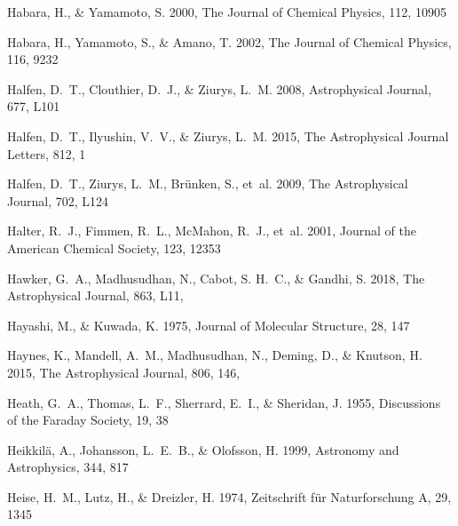\documentclass[twocolumn]{aastex631}
\begin{document}
\begin{thebibliography}{}
Habara, H., \& Yamamoto, S. 2000, The Journal of Chemical Physics, 112, 10905

Habara, H., Yamamoto, S., \& Amano, T. 2002, The Journal of Chemical Physics,
  116, 9232

Halfen, D.~T., Clouthier, D.~J., \& Ziurys, L.~M. 2008, Astrophysical Journal,
  677, L101

Halfen, D.~T., Ilyushin, V.~V., \& Ziurys, L.~M. 2015, The Astrophysical
  Journal Letters, 812, 1

Halfen, D.~T., Ziurys, L.~M., Br{\"u}nken, S., {et~al.} 2009, The Astrophysical
  Journal, 702, L124

Halter, R.~J., Fimmen, R.~L., McMahon, R.~J., {et~al.} 2001, Journal of the
  American Chemical Society, 123, 12353

{Hawker}, G.~A., {Madhusudhan}, N., {Cabot}, S. H.~C., \& {Gandhi}, S. 2018,
  The Astrophysical Journal, 863, L11, 

Hayashi, M., \& Kuwada, K. 1975, Journal of Molecular Structure, 28, 147

{Haynes}, K., {Mandell}, A.~M., {Madhusudhan}, N., {Deming}, D., \& {Knutson},
  H. 2015, The Astrophysical Journal, 806, 146,

Heath, G.~A., Thomas, L.~F., Sherrard, E.~I., \& Sheridan, J. 1955, Discussions
  of the Faraday Society, 19, 38

{Heikkil{\"a}}, A., {Johansson}, L.~E.~B., \& {Olofsson}, H. 1999, Astronomy
  and Astrophysics, 344, 817

Heise, H.~M., Lutz, H., \& Dreizler, H. 1974, Zeitschrift f{\"u}r
  Naturforschung A, 29, 1345


\end{thebibliography}
\end{document}
